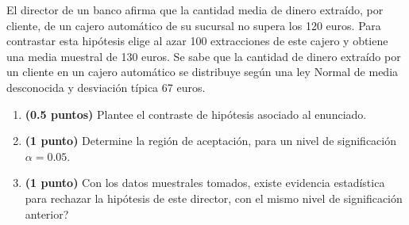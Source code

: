 
El director de un banco afirma que la cantidad media de dinero extraído, por cliente, de un cajero automático de su sucursal no supera los 120 euros. Para contrastar esta hipótesis elige al azar 100 extracciones de este cajero y obtiene una media muestral de 130 euros. Se sabe que la cantidad de dinero extraído por un cliente en un cajero automático se distribuye según una ley Normal de media desconocida y desviación típica 67 euros.
\begin{enumerate}[label=\alph*)]
\item \textbf{(0.5 puntos)} Plantee el contraste de hipótesis asociado al enunciado.
\item \textbf{(1 punto)} Determine la región de aceptación, para un nivel de significación $\alpha=0.05$.
\item \textbf{(1 punto)} Con los datos muestrales tomados, \textquestiondown{}existe evidencia estadística para rechazar la hipótesis de este director, con el mismo nivel de significación anterior?
\end{enumerate}
